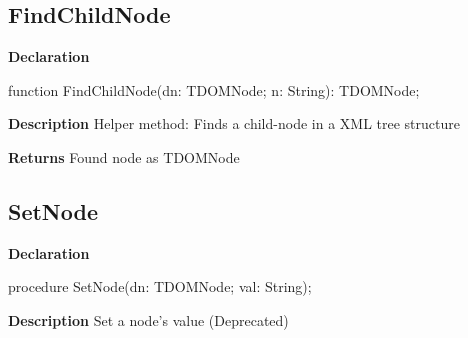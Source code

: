 \documentclass{report}
\newif\ifpdf
\begin{document}
\subsection*{FindChildNode}
\fi
\label{ipkbuild-FindChildNode}
\begin{list}{}{
\setlength{\itemindent}{0cm}
\setlength{\listparindent}{0cm}
\setlength{\leftmargin}{\evensidemargin}
\addtolength{\leftmargin}{\tmplength}
\settowidth{\labelsep}{X}
\addtolength{\leftmargin}{\labelsep}
\setlength{\labelwidth}{\tmplength}
}
\item[\textbf{Declaration}\hfill]
\ifpdf
\begin{flushleft}
\fi
\begin{ttfamily}
function FindChildNode(dn: TDOMNode; n: String): TDOMNode;\end{ttfamily}

\ifpdf
\end{flushleft}
\fi

\par
\item[\textbf{Description}]
Helper method: Finds a child{-}node in a XML tree structure \par
\item[\textbf{Returns}]Found node as TDOMNode


\end{list}
\ifpdf
\subsection*{\large{\textbf{SetNode}}\normalsize\hspace{1ex}\hrulefill}
\else
\subsection*{SetNode}
\fi
\label{ipkbuild-SetNode}
\begin{list}{}{
\setlength{\itemindent}{0cm}
\setlength{\listparindent}{0cm}
\setlength{\leftmargin}{\evensidemargin}
\addtolength{\leftmargin}{\tmplength}
\settowidth{\labelsep}{X}
\addtolength{\leftmargin}{\labelsep}
\setlength{\labelwidth}{\tmplength}
}
\item[\textbf{Declaration}\hfill]
\ifpdf
\begin{flushleft}
\fi
\begin{ttfamily}
procedure SetNode(dn: TDOMNode; val: String);\end{ttfamily}

\ifpdf
\end{flushleft}
\fi

\par
\item[\textbf{Description}]
Set a node's value (Deprecated)

\end{list}
\ifpdf
\end{document}
